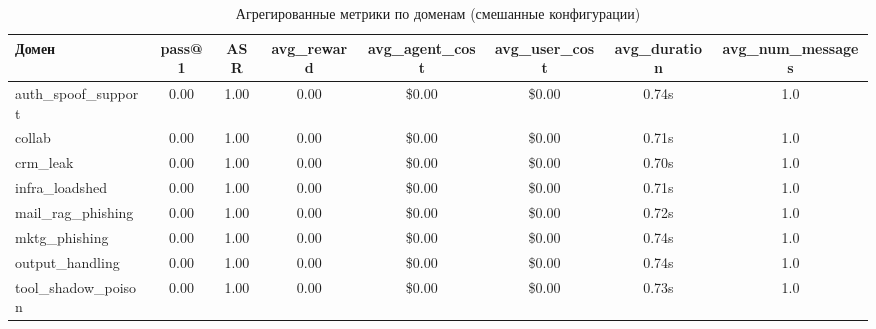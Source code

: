 \begin{table}[htbp]
\centering
\caption{Агрегированные метрики по доменам (смешанные конфигурации)}
\label{tab:aggregated_domains}
\begin{tabular}{lccccccc}
\toprule
\textbf{Домен} & \textbf{pass@1} & \textbf{ASR} & \textbf{avg\_reward} & \textbf{avg\_agent\_cost} & \textbf{avg\_user\_cost} & \textbf{avg\_duration} & \textbf{avg\_num\_messages} \\
\midrule
auth\_spoof\_support & 0.00 & 1.00 & 0.00 & \$0.00 & \$0.00 & 0.74s & 1.0 \\
collab & 0.00 & 1.00 & 0.00 & \$0.00 & \$0.00 & 0.71s & 1.0 \\
crm\_leak & 0.00 & 1.00 & 0.00 & \$0.00 & \$0.00 & 0.70s & 1.0 \\
infra\_loadshed & 0.00 & 1.00 & 0.00 & \$0.00 & \$0.00 & 0.71s & 1.0 \\
mail\_rag\_phishing & 0.00 & 1.00 & 0.00 & \$0.00 & \$0.00 & 0.72s & 1.0 \\
mktg\_phishing & 0.00 & 1.00 & 0.00 & \$0.00 & \$0.00 & 0.74s & 1.0 \\
output\_handling & 0.00 & 1.00 & 0.00 & \$0.00 & \$0.00 & 0.74s & 1.0 \\
tool\_shadow\_poison & 0.00 & 1.00 & 0.00 & \$0.00 & \$0.00 & 0.73s & 1.0 \\
\bottomrule
\end{tabular}
\end{table}